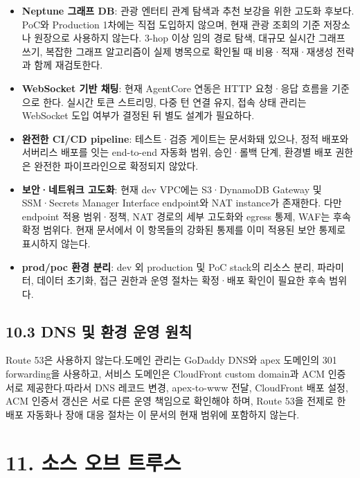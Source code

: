 \documentclass[12pt,a4paper]{article}
\newcommand{\DocNeedspace}[1]{\par\ifdim\dimexpr\pagegoal-\pagetotal\relax<#1\newpage\fi}
\newcommand{\TocNoChildTight}{\vspace{-0.28em}}
\begin{document}
\begin{itemize}
\item \textbf{Neptune 그래프 DB}: 관광 엔터티 관계 탐색과 추천 보강을 위한 고도화 후보다. PoC와 Production 1차에는 직접 도입하지 않으며, 현재 관광 조회의 기준 저장소나 원장으로 사용하지 않는다. 3-hop 이상 임의 경로 탐색, 대규모 실시간 그래프 쓰기, 복잡한 그래프 알고리즘이 실제 병목으로 확인될 때 비용·적재·재생성 전략과 함께 재검토한다.
\item \textbf{WebSocket 기반 채팅}: 현재 AgentCore 연동은 HTTP 요청·응답 흐름을 기준으로 한다. 실시간 토큰 스트리밍, 다중 턴 연결 유지, 접속 상태 관리는 WebSocket 도입 여부가 결정된 뒤 별도 설계가 필요하다.
\item \textbf{완전한 CI/CD pipeline}: 테스트·검증 게이트는 문서화돼 있으나, 정적 배포와 서버리스 배포를 잇는 end-to-end 자동화 범위, 승인·롤백 단계, 환경별 배포 권한은 완전한 파이프라인으로 확정되지 않았다.
\item \textbf{보안·네트워크 고도화}: 현재 dev VPC에는 S3·DynamoDB Gateway 및 SSM·Secrets Manager Interface endpoint와 NAT instance가 존재한다. 다만 endpoint 적용 범위·정책, NAT 경로의 세부 고도화와 egress 통제, WAF는 후속 확정 범위다. 현재 문서에서 이 항목들의 강화된 통제를 이미 적용된 보안 통제로 표시하지 않는다.
\item \textbf{prod/poc 환경 분리}: dev 외 production 및 PoC stack의 리소스 분리, 파라미터, 데이터 초기화, 접근 권한과 운영 절차는 확정·배포 확인이 필요한 후속 범위다.
\end{itemize}

\DocNeedspace{10\baselineskip}
\subsection*{10.3 DNS 및 환경 운영 원칙}

Route 53은 사용하지 않는다.\newline 도메인 관리는 GoDaddy DNS와 apex 도메인의 301 forwarding을 사용하고, 서비스 도메인은 CloudFront custom domain과 ACM 인증서로 제공한다.\newline 따라서 DNS 레코드 변경, apex-to-www 전달, CloudFront 배포 설정, ACM 인증서 갱신은 서로 다른 운영 책임으로 확인해야 하며, Route 53을 전제로 한 배포 자동화나 장애 대응 절차는 이 문서의 현재 범위에 포함하지 않는다.


\newpage

\DocNeedspace{10\baselineskip}
\section*{11. 소스 오브 트루스}
\addtocontents{toc}{\protect\TocNoChildTight}
\end{document}

